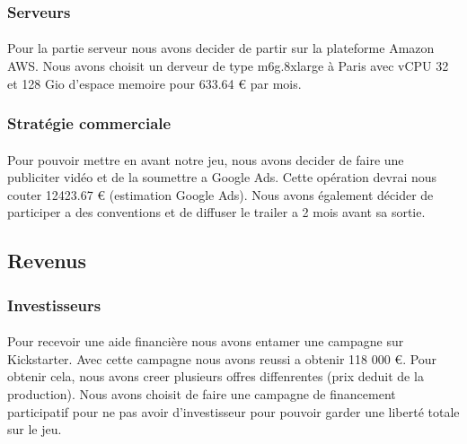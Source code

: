 \documentclass{article}
\begin{document}
\subsubsection{Serveurs}
\paragraph{} Pour la partie serveur nous avons decider de partir sur la plateforme Amazon AWS. Nous avons choisit un derveur de type m6g.8xlarge à Paris avec vCPU 32 et 128 Gio d'espace memoire pour 633.64 € par mois.

\subsubsection{Stratégie commerciale}
\paragraph{} Pour pouvoir mettre en avant notre jeu, nous avons decider de faire une publiciter vidéo et de la soumettre a Google Ads. Cette opération devrai nous couter 12423.67 € (estimation Google Ads). Nous avons également décider de participer a des conventions et de diffuser le trailer a 2 mois avant sa sortie.

\subsection{Revenus}
\subsubsection{Investisseurs}
\paragraph{} Pour recevoir une aide financière nous avons entamer une campagne sur Kickstarter. Avec cette campagne nous avons reussi a obtenir 118 000 €. Pour obtenir cela, nous avons creer plusieurs offres diffenrentes (prix deduit de la production). Nous avons choisit de faire une campagne de financement participatif pour ne pas avoir d'investisseur pour pouvoir garder une liberté totale sur le jeu.\\
\end{document}
